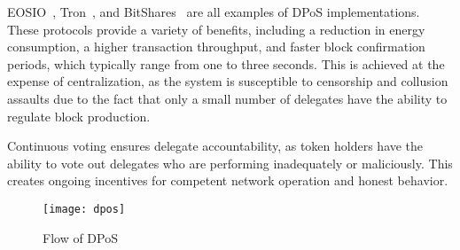 EOSIO~\cite{dpos_eosio}, Tron~\cite{dpos_tron}, and BitShares~\cite{bitshares} are all examples of DPoS implementations.
These protocols provide a variety of benefits, including a reduction in energy consumption, a higher
transaction throughput, and faster block confirmation periods, which typically range from one to three seconds.
This is achieved at the expense of centralization, as the system is susceptible to
censorship and collusion assaults due to the fact that only a small number of delegates have the ability to regulate block production.

Continuous voting ensures delegate accountability, as token holders have the ability to vote out delegates who
are performing inadequately or maliciously. This creates ongoing incentives for competent network operation
and honest behavior.

\begin{figure}[h]
	\centering
	\texttt{[image: dpos]}
	\caption{Flow of DPoS}
	\label{fig:dpos}
\end{figure}